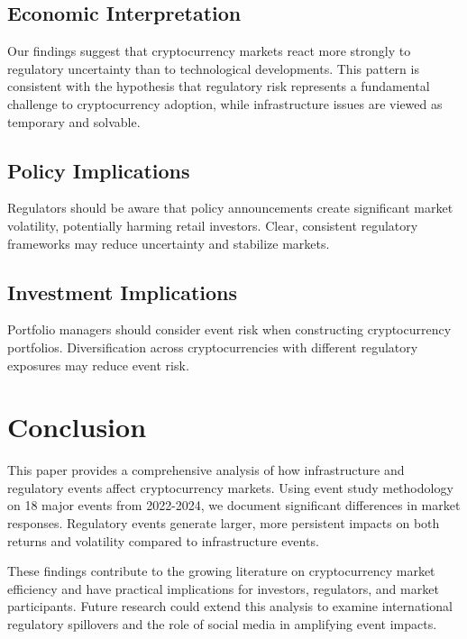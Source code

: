 \documentclass[12pt]{article}
\begin{document}
\subsection{Economic Interpretation}

Our findings suggest that cryptocurrency markets react more strongly to regulatory uncertainty than to technological developments. This pattern is consistent with the hypothesis that regulatory risk represents a fundamental challenge to cryptocurrency adoption, while infrastructure issues are viewed as temporary and solvable.

\subsection{Policy Implications}

Regulators should be aware that policy announcements create significant market volatility, potentially harming retail investors. Clear, consistent regulatory frameworks may reduce uncertainty and stabilize markets.

\subsection{Investment Implications}

Portfolio managers should consider event risk when constructing cryptocurrency portfolios. Diversification across cryptocurrencies with different regulatory exposures may reduce event risk.


\section{Conclusion}

This paper provides a comprehensive analysis of how infrastructure and regulatory events affect cryptocurrency markets. Using event study methodology on 18 major events from 2022-2024, we document significant differences in market responses. Regulatory events generate larger, more persistent impacts on both returns and volatility compared to infrastructure events.

These findings contribute to the growing literature on cryptocurrency market efficiency and have practical implications for investors, regulators, and market participants. Future research could extend this analysis to examine international regulatory spillovers and the role of social media in amplifying event impacts.
\end{document}
